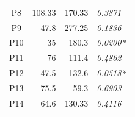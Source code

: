 \begin{table}[]
\begin{tabular}{crrl}
P8                   & 108.33                                                                                                & 170.33                                                                                                   & \textit{0.3871}   \\
P9                   & 47.8                                                                                                  & 277.25                                                                                                   & \textit{0.1836}   \\
P10                  & 35                                                                                                    & 180.3                                                                                                    & \textit{0.0200*} \\
P11                  & 76                                                                                                    & 111.4                                                                                                    & \textit{0.4862}   \\
P12                  & 47.5                                                                                                  & 132.6                                                                                                    & \textit{0.0518*} \\
P13                  & 75.5                                                                                                  & 59.3                                                                                                     & \textit{0.6903}   \\
P14                  & 64.6                                                                                                  & 130.33                                                                                                   & \textit{0.4116}  \\
\bottomrule
\end{tabular}
\end{table}

